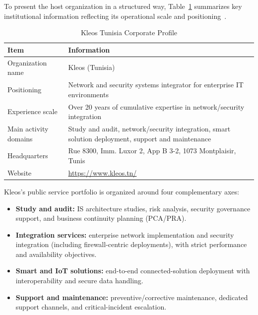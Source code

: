 To present the host organization in a structured way, Table~\ref{tab:kleos_identity} summarizes key institutional information reflecting its operational scale and positioning~\cite{kleos_directory,kleos_home}.

\begin{table}[htpb]
    \centering
    \caption{Kleos Tunisia Corporate Profile}
    \label{tab:kleos_identity}
    \renewcommand{\arraystretch}{1.3}
    \small
    \begin{tabular}{|p{4cm}|p{8.5cm}|}
        \hline
        \textbf{Item} & \textbf{Information} \\
        \hline
        Organization name & Kleos (Tunisia) \\
        \hline
        Positioning & Network and security systems integrator for enterprise IT environments \\
        \hline
        Experience scale & Over 20 years of cumulative expertise in network/security integration \\
        \hline
        Main activity domains & Study and audit, network/security integration, smart solution deployment, support and maintenance \\
        \hline
        Headquarters & Rue 8300, Imm. Luxor 2, App B 3-2, 1073 Montplaisir, Tunis \\
        \hline
        Website & \url{https://www.kleos.tn/} \\
        \hline
    \end{tabular}
\end{table}

Kleos's public service portfolio is organized around four complementary axes:
\begin{itemize}
    \item \textbf{Study and audit:} IS architecture studies, risk analysis, security governance support, and business continuity planning (PCA/PRA).
    \item \textbf{Integration services:} enterprise network implementation and security integration (including firewall-centric deployments), with strict performance and availability objectives.
    \item \textbf{Smart and IoT solutions:} end-to-end connected-solution deployment with interoperability and secure data handling.
    \item \textbf{Support and maintenance:} preventive/corrective maintenance, dedicated support channels, and critical-incident escalation.
\end{itemize}


